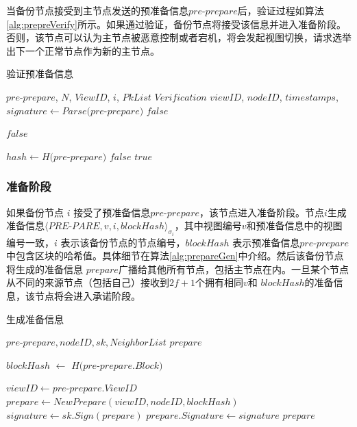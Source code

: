 当备份节点接受到主节点发送的预准备信息$pre$-$prepare$后，验证过程如算法\ref{alg:prepreVerify}所示。如果通过验证，备份节点将接受该信息并进入准备阶段。否则，该节点可以认为主节点被恶意控制或者宕机，将会发起视图切换，请求选举出下一个正常节点作为新的主节点。

 \begin{algorithm}
 \caption{验证预准备信息}
   \begin{algorithmic}[H]\label{alg:prepreVerify}
   \renewcommand{\algorithmicrequire}{\textbf{Input:}}
   \renewcommand{\algorithmicensure}{\textbf{Output:}}
   \REQUIRE $pre$-$prepare$, $N$, $ViewID$, $i$, $PkList$
   \ENSURE  $Verification$
    \STATE $viewID$, $nodeID$, $timestamps$, $signature \gets Parse(pre$-$prepare)$
      \RETURN $false$
    \ENDIF

      \RETURN $false$
    \ENDIF

    \STATE $hash \gets H(pre$-$prepare)$
      \RETURN $false$
    \ENDIF
   \RETURN $true$
   \end{algorithmic}
 \end{algorithm}

\subsubsection{准备阶段}

如果备份节点 $i$ 接受了预准备信息$pre$-$prepare$，该节点进入准备阶段。节点$i$生成准备信息$\langle PRE$-$PARE, v, i, blockHash\rangle_{\sigma_{i}}$，其中视图编号$v$和预准备信息中的视图编号一致，$i$ 表示该备份节点的节点编号，$blockHash$ 表示预准备信息$pre$-$prepare$中包含区块的哈希值。具体细节在算法\ref{alg:prepareGen}中介绍。然后该备份节点将生成的准备信息 $prepare$广播给其他所有节点，包括主节点在内。一旦某个节点从不同的来源节点（包括自己）接收到$2f+1$个拥有相同$v$和 $blockHash$的准备信息，该节点将会进入承诺阶段。

 \begin{algorithm}
 \caption{生成准备信息}
   \begin{algorithmic}[H]\label{alg:prepareGen}
   \renewcommand{\algorithmicrequire}{\textbf{Input:}}
   \renewcommand{\algorithmicensure}{\textbf{Output:}}
   \REQUIRE $pre$-$prepare, nodeID, sk, NeighborList$
   \ENSURE  $prepare$

    \STATE $blockHash$ $\gets$ $H(pre$-$prepare.Block)$

    \STATE $viewID \gets pre$-$prepare.ViewID$
    \STATE $prepare \gets NewPrepare(viewID, nodeID, blockHash)$
    \STATE $signature \gets sk.Sign(prepare)$
    \STATE $prepare.Signature \gets signature$
   \RETURN $prepare$
   \end{algorithmic}
 \end{algorithm}

